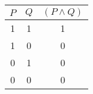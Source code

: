 \begin{tabular}{|c|c||c|}
\hline
$ P $ & $ Q $ & $ (P \wedge Q) $ \\
\hline
1 & 1 & 1 \\
1 & 0 & 0 \\
0 & 1 & 0 \\
0 & 0 & 0 \\
\hline
\end{tabular}
